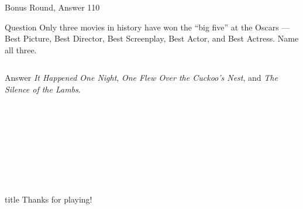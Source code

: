 \documentclass[11pt]{beamer}
\begin{document}
\begin{frame}[t]{Bonus Round, Answer 110}
\vspace{2em}
\begin{block}{Question}
Only three movies in history have won the ``big five'' at the Oscars — Best Picture, Best Director, Best Screenplay, Best Actor, and Best Actress. Name all three.
\end{block}
\pause{}
\begin{columns}[T,totalwidth=\linewidth]
\begin{column}{0.35\linewidth}
\begin{block}{Answer}
\emph{It Happened One Night}, \emph{One Flew Over the Cuckoo's Nest}, and \emph{The Silence of the Lambs}.
\end{block}
\end{column}
\begin{column}{0.6\linewidth}
\begin{center}
\texttt{[image: \{Images/big-five]}.png}
\end{center}
\end{column}
\end{columns}
\end{frame}
    

\section*{\ }
\subsection*{\ }
\begingroup{}
\begin{frame}
\vfill{}
\centering{}
\begin{beamercolorbox}[sep=8pt,center,shadow=true,rounded=true]{title}
Thanks for playing!\par%
\end{beamercolorbox}
\vfill{}
\end{frame}
\endgroup{}
\end{document}
